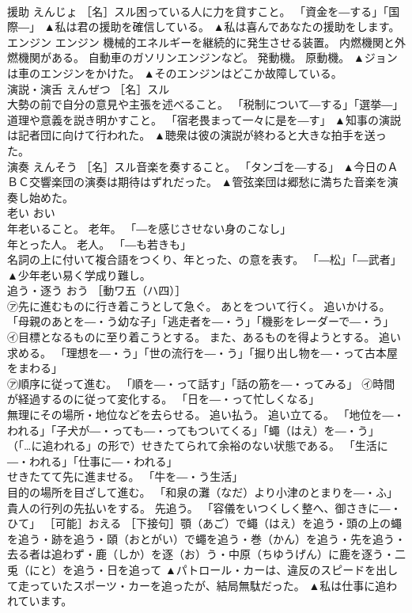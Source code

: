 \documentclass[8pt]{extreport}
\begin{document}
\begin{CJK}{UTF8}{min}
\\	援助	えんじょ	［名］スル困っている人に力を貸すこと。 「資金を―する」「国際―」	▲私は君の援助を確信している。 ▲私は喜んであなたの援助をします。
\\	エンジン	エンジン	機械的エネルギーを継続的に発生させる装置。 内燃機関と外燃機関がある。 自動車のガソリンエンジンなど。 発動機。 原動機。	▲ジョンは車のエンジンをかけた。 ▲そのエンジンはどこか故障している。
\\	演説・演舌	えんぜつ	［名］スル 
\\	大勢の前で自分の意見や主張を述べること。 「税制について―する」「選挙―」 
\\	道理や意義を説き明かすこと。 「宿老畏まって一々に是を―す」	▲知事の演説は記者団に向けて行われた。 ▲聴衆は彼の演説が終わると大きな拍手を送った。
\\	演奏	えんそう	［名］スル音楽を奏すること。 「タンゴを―する」	▲今日のＡＢＣ交響楽団の演奏は期待はずれだった。 ▲管弦楽団は郷愁に満ちた音楽を演奏し始めた。
\\	老い	おい	
\\	年老いること。 老年。 「―を感じさせない身のこなし」 
\\	年とった人。 老人。 「―も若きも」 
\\	名詞の上に付いて複合語をつくり、年とった、の意を表す。 「―松」「―武者」	▲少年老い易く学成り難し。
\\	追う・逐う	おう	［動ワ五（ハ四）］ 
\\	㋐先に進むものに行き着こうとして急ぐ。 あとをついて行く。 追いかける。 「母親のあとを―・う幼な子」「逃走者を―・う」「機影をレーダーで―・う」 ㋑目標となるものに至り着こうとする。 また、あるものを得ようとする。 追い求める。 「理想を―・う」「世の流行を―・う」「掘り出し物を―・って古本屋をまわる」 
\\	㋐順序に従って進む。 「順を―・って話す」「話の筋を―・ってみる」 ㋑時間が経過するのに従って変化する。 「日を―・って忙しくなる」 
\\	無理にその場所・地位などを去らせる。 追い払う。 追い立てる。 「地位を―・われる」「子犬が―・っても―・ってもついてくる」「蠅（はえ）を―・う」 
\\	（「…に追われる」の形で）せきたてられて余裕のない状態である。 「生活に―・われる」「仕事に―・われる」 
\\	せきたてて先に進ませる。 「牛を―・う生活」 
\\	目的の場所を目ざして進む。 「和泉の灘（なだ）より小津のとまりを―・ふ」 
\\	貴人の行列の先払いをする。 先追う。 「容儀をいつくしく整へ、御さきに―・ひて」 ［可能］おえる ［下接句］顎（あご）で蠅（はえ）を追う・頭の上の蠅を追う・跡を追う・頤（おとがい）で蠅を追う・巻（かん）を追う・先を追う・去る者は追わず・鹿（しか）を逐（お）う・中原（ちゆうげん）に鹿を逐う・二兎（にと）を追う・日を追って	▲パトロール・カーは、違反のスピードを出して走っていたスポーツ・カーを追ったが、結局無駄だった。 ▲私は仕事に追われています。

\end{CJK}
\end{document}
